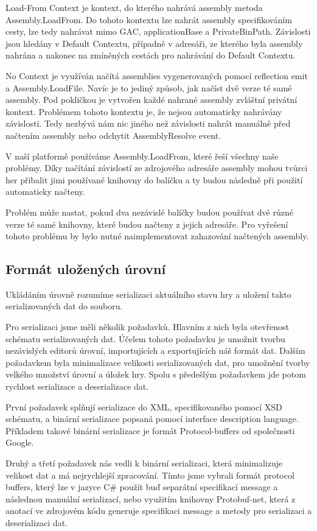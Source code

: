 Load-From Context je kontext, do kterého nahrává assembly metoda Assembly.LoadFrom. Do tohoto kontextu lze nahrát assembly specifikováním cesty, lze tedy nahrávat mimo GAC, applicationBase a PrivateBinPath. Závislosti jsou hledány v Default Contextu, případně v adresáři, ze kterého byla assembly nahrána a nakonec na zmíněných cestách pro nahrávání do Default Contextu.

No Context je využíván načítá  assemblies vygenerovaných pomocí reflection emit a Assembly.LoadFile. Navíc je to jediný způsob, jak načíst dvě verze té samé assembly. Pod pokličkou je vytvořen každé nahrané assembly zvláštní privátní kontext. Problémem tohoto kontextu je, že nejsou automaticky nahrávány závislosti. Tedy nezbývá nám nic jiného než závislosti nahrát manuálně před načtením assembly nebo odchytit AssemblyResolve event.

V naší platformě používáme Assembly.LoadFrom, které řeší všechny naše problémy. Díky načítání závislostí ze zdrojového adresáře assembly mohou tvůrci her přibalit jimi používané knihovny do balíčku a ty budou následně při použití automaticky načteny.

Problém může nastat, pokud dva nezávislé balíčky budou používat dvě různé verze té samé knihovny, které budou načteny z jejich adresáře. Pro vyřešení tohoto problému by bylo nutné naimplementovat zahazování načtených assembly.

\subsection{Formát uložených úrovní}
Ukládáním úrovně rozumíme serializaci aktuálního stavu hry a uložení takto serializovaných dat do souboru.

Pro serializaci jsme měli několik požadavků. Hlavním z nich byla otevřenost schématu serializovaných dat. Účelem tohoto požadavku je umožnit tvorbu nezávislých editorů úrovní, importujících a exportujících náš formát dat. Dalším požadavkem byla minimalizace velikosti serializovaných dat, pro umožnění tvorby velkého množství úrovní a úložek hry. Spolu s předešlým požadavkem jde potom rychlost serializace a deserializace dat.

První požadavek splňují serializace do XML, specifikovaného pomocí XSD schématu, a binární serializace popsaná pomocí interface description language. Příkladem takové binární serializace je formát Protocol-buffers od společnosti Google. 

Druhý a třetí požadavek nás vedli k binární serializaci, která minimalizuje velikost dat a má nejrychlejší zpracování. Tímto jsme vybrali formát protocol buffers, který lze v jazyce C\# použít buď separátní specifikací message a následnou manuální serializací, nebo využitím knihovny Protobuf-net, která z anotací ve zdrojovém kódu generuje specifikaci message a  metody pro serializaci a deserializaci dat.

